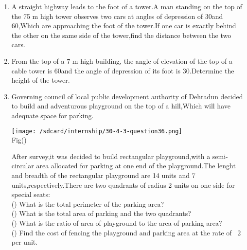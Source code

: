 \documentclass{article}
\begin{document}
\begin{enumerate}
    \item A straight highway leads to the foot of a tower.A man standing on the top of the 75 m high tower observes two cars at angles of depression of 30\degree and 60\degree,Which are approaching the foot of the tower.If one car is exactly behind the other on the same side of the tower,find the distance between the two cars.\\
    \item From the top of a 7 m high building, the angle of elevation of the top of a cable tower is 60\degree and the angle of depression of its foot is 30\degree.Determine the height of the tower.\\
    \item Governing council of local public development authority of Dehradun decided to build and adventurous playground on the top of a hill,Which will have adequate space for parking.
        \begin{center}
        \texttt{[image: /sdcard/internship/30-4-3-question36.png]}\\
        Fig()
    \end{center}
    After survey,it was decided to build rectangular playground,with a semi-circular area allocated for parking at one end of the playground.The lenght and breadth of the rectangular playground are 14 units and 7 units,respectively.There are two quadrants of radius 2 units on one side for special seats:\\
    () What is the total perimeter of the parking area?\\
    () What is the total area of parking and the two quadrants?\\
    () What is the ratio of area of playground to the area of parking area?\\
    () Find the cost of fencing the playground and parking area at the rate of \rupee~2 per unit.
\end{enumerate}
\end{document}

